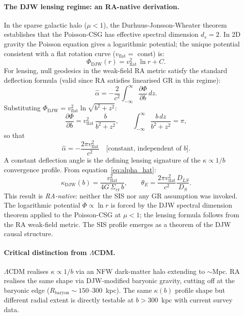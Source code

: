 \documentclass[11pt,a4paper]{article}
\theoremstyle{plain}
\theoremstyle{definition}
\theoremstyle{remark}
\begin{document}
\paragraph{The DJW lensing regime: an RA-native derivation.}
In the sparse galactic halo ($\mu < 1$), the Durhuus-Jonsson-Wheater theorem
establishes that the Poisson-CSG has effective spectral dimension $d_s = 2$.
In 2D gravity the Poisson equation gives a logarithmic potential; the unique
potential consistent with a flat rotation curve ($v_\mathrm{flat} = $ const) is:
\begin{equation}
  \Phi_{\mathrm{DJW}}(r) = v_{\mathrm{flat}}^2\,\ln r + C.
  \label{eq:log_potential}
\end{equation}
For lensing, null geodesics in the weak-field RA metric satisfy the standard
deflection formula (valid since RA satisfies linearised GR in this regime):
\begin{equation}
  \hat\alpha
  = -\frac{2}{c^2}\int_{-\infty}^{\infty}\frac{\partial\Phi}{\partial b}\,dz.
  \label{eq:deflection}
\end{equation}
Substituting $\Phi_{\mathrm{DJW}} = v_{\mathrm{flat}}^2\ln\sqrt{b^2+z^2}$:
\begin{equation}
  \frac{\partial\Phi}{\partial b} = v_{\mathrm{flat}}^2\,\frac{b}{b^2+z^2},
  \qquad
  \int_{-\infty}^{\infty}\frac{b\,dz}{b^2+z^2} = \pi,
\end{equation}
so that
\begin{equation}
  \hat\alpha = -\frac{2\pi v_{\mathrm{flat}}^2}{c^2}
  \quad\text{[constant, independent of }b\text{].}
  \label{eq:alpha_hat}
\end{equation}
A constant deflection angle is the defining lensing signature of the
$\kappa\propto 1/b$ convergence profile. From equation~\eqref{eq:alpha_hat}:
\begin{equation}
  \boxed{
  \kappa_{\mathrm{DJW}}(b)
  = \frac{v_{\mathrm{flat}}^2}{4G\,\Sigma_{\mathrm{cr}}\,b},
  \qquad
  \theta_E = \frac{2\pi v_{\mathrm{flat}}^2}{c^2}\frac{D_{LS}}{D_S}.
  }
  \label{eq:kappa_DJW}
\end{equation}
This result is \emph{RA-native}: neither the SIS nor any GR assumption was
invoked. The logarithmic potential $\Phi \propto \ln r$ is forced by the DJW
spectral dimension theorem applied to the Poisson-CSG at $\mu < 1$; the
lensing formula follows from the RA weak-field metric. The SIS profile emerges
as a theorem of the DJW causal structure.

\paragraph{Critical distinction from $\Lambda$CDM.}
$\Lambda$CDM realises $\kappa \propto 1/b$ via an NFW dark-matter halo
extending to $\sim$Mpc. RA realises the same shape via DJW-modified baryonic
gravity, cutting off at the baryonic edge ($R_\mathrm{baryon}\sim 150$--300~kpc).
The same $\kappa(b)$ profile shape but different radial extent is directly
testable at $b > 300$~kpc with current survey data.
\end{document}
